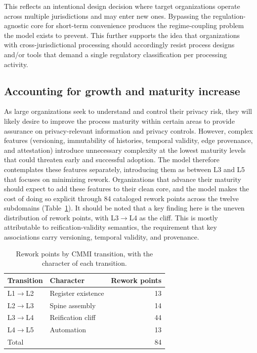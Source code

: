 \documentclass[10pt,letterpaper,twocolumn,twoside]{rho-class/rho}
\begin{document}
This reflects an intentional design decision where target organizations operate across multiple jurisdictions and may enter new ones. Bypassing the regulation-agnostic core for short-term convenience produces the regime-coupling problem the model exists to prevent. This further supports the idea that organizations with cross-jurisdictional processing should accordingly resist process designs and/or tools that demand a single regulatory classification per processing activity. 

\subsection{Accounting for growth and maturity increase}\label{sec:maturity}

As large organizations seek to understand and control their privacy risk, they will likely desire to improve the process maturity within certain areas to provide assurance on privacy-relevant information and privacy controls. However, complex features (versioning, immutability of histories, temporal validity, edge provenance, and attestation) introduce unnecessary complexity at the lowest maturity levels that could threaten early and successful adoption. The model therefore contemplates these features separately, introducing them as between L3 and L5 that focuses on minimizing rework. Organizations that advance their maturity should expect to add these features to their clean core, and the model makes the cost of doing so explicit through 84 cataloged rework points across the twelve subdomains (Table~\ref{tab:rework}). It should be noted that a key finding here is the uneven distribution of rework points, with L3$\to$L4 as the cliff. This is mostly attributable to reification-validity semantics, the requirement that key associations carry versioning, temporal validity, and provenance. 

\begin{table}[ht]
\centering
\caption{Rework points by CMMI transition, with the character of each transition.}
\label{tab:rework}
\small
\begin{tabular}{@{}l l r@{}}
\hline
Transition & Character & Rework points \\
\hline
L1$\to$L2 & Register existence & 13 \\
L2$\to$L3 & Spine assembly & 14 \\
L3$\to$L4 & Reification cliff & 44 \\
L4$\to$L5 & Automation & 13 \\
\hline
Total & & 84 \\
\hline
\end{tabular}
\end{table}
\end{document}
